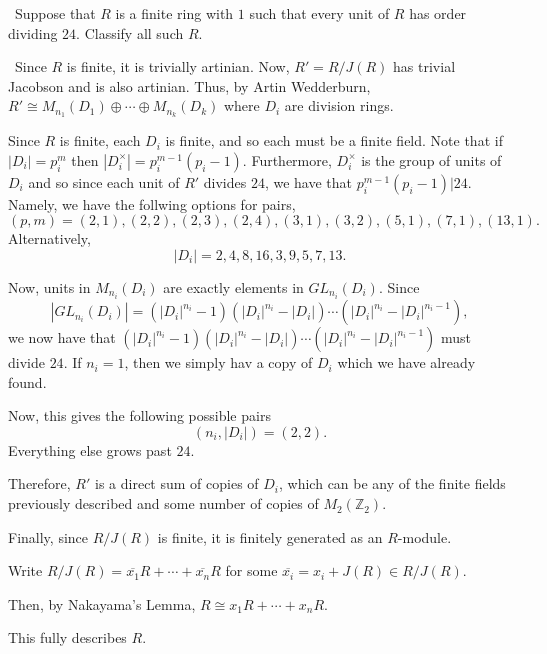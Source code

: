 \documentclass[12pt]{Qual}
\begin{document}
\begin{problem} $\,$
Suppose that $R$ is a finite ring with $1$ such that every unit of $R$ has order dividing $24$. Classify all such $R$.
\end{problem}



\begin{solution}$\,$
Since $R$ is finite, it is trivially artinian. Now, $R'=R/J(R)$ has trivial Jacobson and is also artinian. Thus, by Artin Wedderburn, $R'\cong M_{n_1}(D_1)\oplus\cdots\oplus M_{n_k}(D_k)$ where $D_i$ are division rings.

Since $R$ is finite, each $D_i$ is finite, and so each must be a finite field. Note that if $|D_i|=p_i^m$ then $|D_i^\times|=p_i^{m-1}(p_i-1)$. Furthermore, $D_i^\times$ is the group of units of $D_i$ and so since each unit of $R'$ divides $24$, we have that $p_i^{m-1}(p_i-1)|24$. Namely, we have the follwing options for pairs, $$(p,m)=(2,1),(2,2),(2,3),(2,4),(3,1),(3,2),(5,1),(7,1),(13,1).$$ Alternatively, $$|D_i|=2,4,8,16,3,9,5,7,13.$$

Now, units in $M_{n_i}(D_i)$ are exactly elements in $GL_{n_i}(D_i)$. Since $$|GL_{n_i}(D_i)|=(|D_i|^{n_i}-1)(|D_i|^{n_i}-|D_i|)\cdots(|D_i|^{n_i}-|D_i|^{n_i-1}),$$ we now have that $(|D_i|^{n_i}-1)(|D_i|^{n_i}-|D_i|)\cdots(|D_i|^{n_i}-|D_i|^{n_i-1})$ must divide $24$. If $n_i=1$, then we simply hav a copy of $D_i$ which we have already found.

Now, this gives the following possible pairs $$(n_i,|D_i|)=(2,2).$$ Everything else grows past $24$.

Therefore, $R'$ is a direct sum of copies of $D_i$, which can be any of the finite fields previously described and some number of copies of $M_2(\mathbb{Z}_2)$.

Finally, since $R/J(R)$ is finite, it is finitely generated as an $R$-module.

Write $R/J(R)=\overline{x_1}R+\cdots+\overline{x_n}R$ for some $\overline{x_i}=x_i+J(R)\in R/J(R)$.

Then, by Nakayama's Lemma, $R\cong x_1R+\cdots+x_nR$.

This fully describes $R.$
\end{solution}
\newpage
\end{document}
